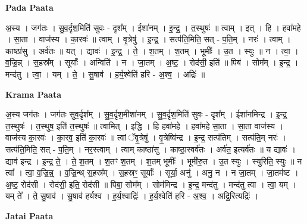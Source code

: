 \documentclass[17pt]{extarticle}
\begin{document}
\textbf{Pada Paata} \newline

अ॒स्य । जग॑तः । सु॒व॒र्दृश॒मिति॑ सुवः - दृश᳚म् । ईशा॑नम् । इ॒न्द्र॒ । त॒स्थुषः॑ ॥ त्वाम् । इत् । हि । हवा॑महे । सा॒ता । वाज॑स्य । का॒रवः॑ ॥ त्वाम् । वृ॒त्रेषु॑ । इ॒न्द्र॒ । सत्प॑ति॒मिति॒ सत् - प॒ति॒म् । नरः॑ । त्वाम् । काष्ठा॑सु । अर्व॑तः ॥ यत् । द्यावः॑ । इ॒न्द्र॒ । ते॒ । श॒तम् । श॒तम् । भूमीः᳚ । उ॒त । स्युः ॥ न । त्वा॒ । व॒ज्रि॒न्न् । स॒हस्र᳚म् । सूर्याः᳚ । अन्विति॑ ।   न । जा॒तम् । अ॒ष्ट॒ । रोद॑सी॒ इति॑ ॥ पिब॑ । सोम᳚म् । इ॒न्द्र॒ । मन्द॑तु । त्वा॒ । यम् । ते॒ । सु॒षाव॑ । ह॒र्य॒श्वेति॑ हरि - अ॒श्व॒ । अद्रिः॑ ॥  \newline


\textbf{Krama Paata} \newline

अ॒स्य जग॑तः । जग॑तः सुव॒र्दृश᳚म् । सु॒व॒र्दृश॒मीशा॑नम् । सु॒व॒र्दृश॒मिति॑ सुवः - दृश᳚म् । ईशा॑नमिन्द्र । इ॒न्द्र॒ त॒स्थुषः॑ । त॒स्थुष॒ इति॑ त॒स्थुषः॑ ॥ त्वामित् । इद्धि । हि हवा॑महे । हवा॑महे सा॒ता । सा॒ता वाज॑स्य । वाज॑स्य का॒रवः॑ । का॒रव॒ इति॑ का॒रवः॑ ॥ त्वां ॅवृ॒त्रेषु॑ । वृ॒त्रेष्वि॑न्द्र । इ॒न्द्र॒ सत्प॑तिम् । सत्प॑ति॒म् नरः॑ । सत्प॑ति॒मिति॒ सत् - प॒ति॒म् । नर॒स्त्वाम् । त्वाम् काष्ठा॑सु । काष्ठा॒स्वर्व॑तः । अर्व॑त॒ इत्यर्व॑तः ॥ य द्यावः॑ । द्याव॑ इन्द्र । इ॒न्द्र॒ ते॒ । ते॒ श॒तम् । श॒तꣳ श॒तम् । श॒तम् भूमीः᳚ । भूमी॑रु॒त । उ॒त स्युः । स्युरिति॒ स्युः ॥ न त्वा᳚ । त्वा॒ व॒ज्रि॒न्न्॒ । व॒ज्रि॒न्थ् स॒हस्र᳚म् । स॒हस्रꣳ॒॒ सूर्याः᳚ । सूर्या॒ अनु॑ । अनु॒ न । न जा॒तम् । जा॒तम॑ष्ट । अ॒ष्ट॒ रोद॑सी । रोद॑सी॒ इति॒ रोद॑सी ॥ पिबा॒ सोम᳚म् । सोम॑मिन्द्र । इ॒न्द्र॒ मन्द॑तु । मन्द॑तु त्वा । त्वा॒ यम् । यम् ते᳚ । ते॒ सु॒षाव॑ । सु॒षाव॑ हर्यश्व । ह॒र्य॒श्वाद्रिः॑ । ह॒र्य॒श्वेति॑ हरि - अ॒श्व॒ । अद्रि॒रित्यद्रिः॑ । \newline

\textbf{Jatai Paata} \newline
\end{document}
